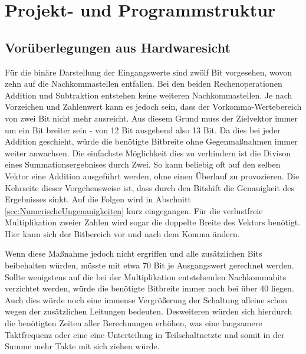 

\section{Projekt- und Programmstruktur}
 \subsection{Vorüberlegungen aus Hardwaresicht}
 Für die binäre Darstellung der Eingangswerte sind zwölf Bit vorgesehen, wovon zehn auf die 
 Nachkommastellen entfallen. Bei den beiden Rechenoperationen Addition und Subtraktion
 entstehen keine weiteren Nachkommastellen. Je nach Vorzeichen und Zahlenwert kann es jedoch sein,
 dass der Vorkomma-Wertebereich von zwei Bit nicht mehr ausreicht. Aus diesem Grund muss der Zielvektor
  immer um ein Bit breiter sein - von 12 Bit ausgehend also 13 Bit.
  Da dies bei jeder Addition geschieht, würde die benötigte Bitbreite ohne Gegenmaßnahmen immer 
  weiter anwachsen. Die einfachste Möglichkeit dies zu verhindern ist die Divison eines Summationsergebnises
  durch Zwei. 
  So kann beliebig oft auf den selben Vektor eine Addition ausgeführt werden, ohne einen Überlauf zu provozieren.
  Die Kehrseite dieser Vorgehensweise ist, dass durch den Bitshift die Genauigkeit des Ergebnisses sinkt.
  Auf die Folgen wird in Abschnitt \ref{sec:NumerischeUngenauigkeiten} kurz eingegangen.
  Für die verlustfreie Multiplikation zweier Zahlen wird sogar die doppelte Breite des Vektors 
  benötigt. Hier kann sich der Bitbereich vor und nach dem Komma ändern.
  
  Wenn diese Maßnahme jedoch nicht ergriffen und alle zusätzlichen Bits beibehalten 
  würden, müsste mit etwa 70 Bit je Ausgangswert gerechnet werden. Sollte wenigstens
  auf die bei der Multiplikation entstehenden Nachkommabits verzichtet werden, 
  würde die benötigte Bitbreite immer noch bei über 40 liegen.
  Auch dies würde noch eine immense Vergrößerung der Schaltung alleine schon wegen der zusätzlichen
  Leitungen bedeuten. Desweiteren würden sich hierdurch die benötigten Zeiten aller Berechnungen erhöhen, 
  was eine langsamere Taktfrequenz oder eine eine Unterteilung in Teilschaltnetzte und somit in der Summe
  mehr Takte mit sich ziehen würde.
  




 
 
